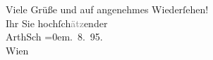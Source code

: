 \begin{ledgroupsized}[t]{13cm}
           \pstart
           Viele Grüße und auf angenehmes Wiederſehen!{\\[\baselineskip]}Ihr Sie
                        hochſch\textcolor{gray}{ätz}ender{\\[\baselineskip]}\spacefill\mbox{ArthSch}\pend
           \leftskip=0em{}. 8. 95.{\\}Wien\pend
                     \endnumbering{}\end{ledgroupsized}  \newcommand{\dateiname}{L00472}\newcommand{\titel}{Arthur Schnitzler an Lou Andreas-Salomé, 11. 8. 1895}\newcommand{\editorInnen}{Martin Anton Müller und Gerd-Hermann Susen}
      